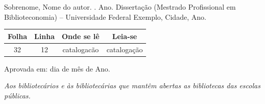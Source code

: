 \documentclass[
  12pt,         %
  oneside,      %
  a4paper,
  english,      %
  brazil        %
]{abntex2}
\newif\ifinstrucoes
\newcommand{\instrucao}[1]{\ifinstrucoes{\color{gray}\small\itshape #1\par}\fi}
\begin{document}
\begin{errata}
  \instrucao{Elemento opcional, inserido depois da folha de rosto. Traga a referência do trabalho e uma tabela com folha, linha, onde se lê e leia-se. Apague o ambiente se não houver erros.}
  Sobrenome, Nome do autor. \textbf{\imprimirtitulo}. Ano. Dissertação (Mestrado Profissional em Biblioteconomia) -- Universidade Federal Exemplo, Cidade, Ano.

  \begin{table}[htb]
    \centering\small
    \begin{tabular}{cccc}
      \toprule
      \textbf{Folha} & \textbf{Linha} & \textbf{Onde se lê} & \textbf{Leia-se} \\
      \midrule
      32 & 12 & catalogacão & catalogação \\
      \bottomrule
    \end{tabular}
  \end{table}
\end{errata}

\begin{folhadeaprovacao}
  \begin{center}
    {\ABNTEXchapterfont\large\imprimirautor}

    \vspace*{\fill}
    {\ABNTEXchapterfont\bfseries\Large\imprimirtitulo}
    \vspace*{\fill}

    \hspace{.45\textwidth}
    \begin{minipage}{.5\textwidth}
      \small\imprimirpreambulo
    \end{minipage}%
    \vspace*{\fill}
  \end{center}

  Aprovada em: dia de mês de Ano.

\end{folhadeaprovacao}

\begin{dedicatoria}
  \vspace*{\fill}
  \begin{flushright}
    \begin{minipage}{.5\textwidth}
      \itshape Aos bibliotecários e às bibliotecárias que mantêm abertas as bibliotecas das escolas públicas.
    \end{minipage}
  \end{flushright}
\end{dedicatoria}
\end{document}
